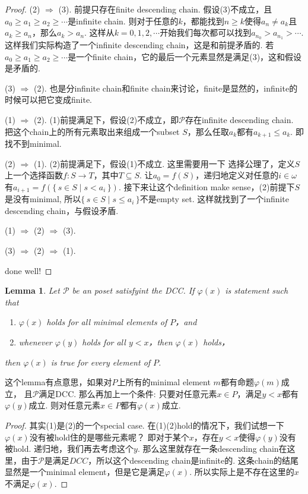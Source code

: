 \documentclass{article}
\newtheorem{lemma}[theorem]{Lemma}
\newcommand*{\xfunc}[4]{{#2}\colon{#3}{#1}{#4}}
\newcommand*{\func}[3]{\xfunc{\to}{#1}{#2}{#3}}
\newcommand\Set[2]{\{\,#1\mid#2\,\}} %
\begin{document}
\begin{proof}
(2) $\Rightarrow$ (3). 前提只存在finite descending chain. 假设(3)不成立，且$a_0 \geq a_1 \geq a_2 \geq \cdots$是infinite chain. 则对于任意的$k$，都能找到$n \geq k$使得$a_n \neq a_k$且$a_k \geq a_n$，那么$a_k > a_n$. 这样从$k=0,1,2,\cdots$开始我们每次都可以找到$a_{n_0} > a_{n_1} > \cdots$. 这样我们实际构造了一个infinite descending chain，这是和前提矛盾的. 若$a_0 \geq a_1 \geq a_2 \geq \cdots$是一个finite chain，它的最后一个元素显然是满足(3)，这和假设是矛盾的. 

(3) $\Rightarrow$ (2). 也是分infinite chain和finite chain来讨论，finite是显然的，infinite的时候可以把它变成finite.

(1) $\Rightarrow$ (2). (1)前提满足下，假设(2)不成立，即$\mathcal{P}$存在infinite descending chain. 把这个chain上的所有元素取出来组成一个subset $S$，那么任取$a_k$都有$a_{k+1} \leq a_k$. 即找不到minimal.

(2) $\Rightarrow$ (1). (2)前提满足下，假设(1)不成立.  这里需要用一下{\color{blue} 选择公理}了，定义$S$上一个选择函数$\func{f}{S}{T}$，其中$T \subseteq S$. 让$a_0 = f(S)$，递归地定义对任意的$i \in \omega$有$a_{i+1} = f(\Set{s \in S}{s < a_i})$. 接下来让这个definition make sense，(2)前提下$S$是没有minimal, 所以$\Set{s \in S}{s \leq a_i}$不是empty set. 这样就找到了一个infinite descending chain，与假设矛盾.

(1) $\Rightarrow$ (2) $\Rightarrow$ (3).

(3) $\Rightarrow$ (2) $\Rightarrow$ (1).

{\color{blue} done well}!
\end{proof}

\begin{lemma}
\rm Let $\mathcal{P}$ be an poset satisfyint the DCC. If $\varphi(x)$ is statement such that
\begin{enumerate}
	\item $\varphi(x)$ holds for all minimal elements of $P$，and
	\item whenever $\varphi(y)$ holds for all $y < x$，then $\varphi(x)$ holds，
\end{enumerate}
then $\varphi(x)$ is true for every element of $P$.
\end{lemma}

{\color{blue} 这个lemma有点意思，如果对$P$上所有的minimal element $m$都有命题$\varphi(m)$成立， 且$\mathcal{P}$满足DCC. 那么再加上一个条件: 只要对任意元素$x \in P$，满足$y < x$都有$\varphi(y)$成立. 则对任意元素$x \in P$都有$\varphi(x)$成立}.

\begin{proof}
其实(1)是(2)的一个special case. 在(1)(2)hold的情况下，我们试想一下$\varphi(x)$没有被hold住的是哪些元素呢？ 即对于某个$x$，存在$y < x$使得$\varphi(y)$没有被hold. 递归地，我们再去考虑这个$y$. 那么这里就存在一条descending chain在这里，由于$\mathcal{P}$是满足$DCC$，所以这个descending chain是infinite的. 这条chain的结尾显然是一个minimal element，但是它是满足$\varphi(x)$. 所以实际上是不存在这里的$x$不满足$\varphi(x)$. 
\end{proof}
\end{document}

